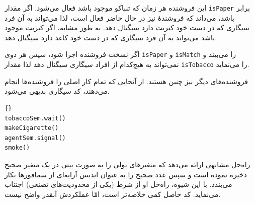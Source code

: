 \documentclass{book}
\begin{document}
    این فروشنده هر زمان که تنباکو موجود باشد فعال می‌شود. اگر مقدار {\tt isPaper} برابر  باشد، می‌داند که فروشندهٔ‌  نیز در حال 
    حاضر فعال است، لذا می‌تواند به آن فرد سیگاری که در دست خود کبریت دارد سیگنال دهد. به طور مشابه، اگر کبریت موجود باشد می‌تواند به آن فرد 
    سیگاری که در دست خود کاغذ دارد سیگنال دهد. 

    اگر نسخت فروشنده  اجرا شود، سپس هر دوی {\tt isPaper} و  {\tt isMatch}  را  می‌بیند و نمی‌تواند به هیچ‌کدام از افراد 
    سیگاری سیگنال دهد لذا مقدار  {\tt isTobacco} را   می‌نماید. 

    فروشنده‌های دیگر نیز چنین هستند. از آنجایی که  تمام کار اصلی را فروشنده‌ها انجام می‌دهند، کد سیگاری بدیهی می‌شود.

\begin{latin}
\begin{lstlisting}[title=\rl{فرد سیگاری با تنباکو}]{}
tobaccoSem.wait()
makeCigarette()
agentSem.signal()
smoke()
\end{lstlisting}
\end{latin}

    راه‌حل مشابهی ارائه می‌دهد که متغیرهای بولی را به صورت بیتی در یک متغیر صحیح ذخیره نموده است و سپس عدد صحیح را به عنوان 
    اندیس آرایه‌ای از سمافورها بکار می‌بندد. با این شیوه، راه‌حل او از شرط (یکی از محدودیت‌های تصنعی) اجتناب می‌نماید. 
    کد حاصل کمی خلاصه‌تر است، امّا عملکردش آنقدر واضح نیست. 
    

\end{document}
